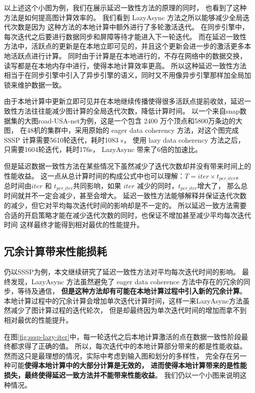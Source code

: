以上述这个小图为例，我们在展示延迟一致性方法的原理的同时，
也看到了这种方法是如何提高图计算效率的。
我们看到 LazyAsync 方法之所以能够减少全局迭代次数是因为
这种方法的本地计算中额外进行了多轮激活迭代。
在同步引擎中，每次迭代之后要进行数据同步和屏障等待才能进入下一轮迭代。
而在延迟一致性方法中，活跃点的更新是在本地立即可见的，并且这个更新会进一步的激活更多本地活跃点进行计算。
同时由于计算是在本地进行的，不存在网络中的数据交换，读写都是在本地内存中进行，使得本地计算效率更高。
所以这种延迟一致性方法相当于在同步引擎中引入了异步引擎的语义\cite{Ju@MACS17}，同时又不用像异步引擎那样加全局加锁来维护数据一致\cite{Xie@PPoPP15}。

由于本地计算中更新立即可见并在本地继续传播使得很多活跃点提前收敛，延迟一致性方法往往能减少图计算的全局迭代次数，降低计算时间。
以一个来自snap\cite{SNAP}数据集的大图road-USA-net为例，这是一个包含 2400 万个顶点和5800万条边的大图，
在48机的集群中，采用原始的 eager data coherency 方法，对这个图完成 SSSP 计算需要5610轮迭代，耗时1083 s， 
使用 lazy data coherency 方法之后，只需要1604轮迭代，耗时176s，
LazyAsync 带来了6倍的加速比。

但是延迟数据一致性方法在某些情况下虽然减少了迭代次数却并没有带来时间上的性能收益。
这一点从总计算时间的构成公式\cite{bsp@1990}中也可以理解：$T=iter \times t_{per\_iter}$。
总时间由$iter$ 和 $t_{per\_iter}$共同影响，如果 $iter$ 减少的同时，$t_{per\_iter}$增大了，
那么总时间就并不一定会减少，甚至会增大。
延迟一致性方法能够解释并保证迭代次数的减少，但它对平均每次迭代时间的影响却是不一定的。
所以延迟一致方法需要合适的开启策略才能在减少迭代次数的同时，也保证不增加甚至减少平均每次迭代时间
这样最终才能得到相对最优的性能提升。

\subsection{冗余计算带来性能损耗}
仍以SSSP为例，本文继续研究了延迟一致性方法对平均每次迭代时间的影响。
最终发现，LazyAsync 方法虽然避免了 eager data coherence 方法中存在的冗余的同步，等待及通信，
\textbf{但是这种方法却有可能在本地计算过程中引入新的冗余计算}。
本地计算过程中的冗余计算会增加单次迭代计算时间，这样一来LazyAsync方法虽然减少了图计算过程的迭代轮次，
但是却最终因为单次迭代时间的增加而拿不到相对最优的性能提升。


在图\ref{fig:sssp-lazy-iter}中，每一轮迭代之后本地计算激活的点在数据一致性阶段最终都求得了正确的值。
所以，每次迭代中的本地计算部分带来的都是性能收益。
然而这只是最理想的情况，实际中考虑到输入图和划分的多样性，
完全存在另一种可能\textbf{使得本地计算中的大部分计算是无效的，
进而使得本地计算带来的是性能损失，最终使得延迟一致方法并不能带来性能收益}。
我们仍以一个小图来说明这种情况。


